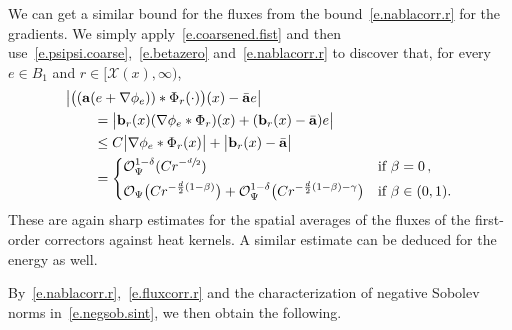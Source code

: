 \documentclass[11pt]{article} %
\numberwithin{equation}{section}
\theoremstyle{definition}
\let\originalleft\left
\let\originalright\right
\renewcommand{\left}{\mathopen{}\mathclose\bgroup\originalleft}
\renewcommand{\right}{\aftergroup\egroup\originalright}
\renewcommand{\b}{\ensuremath{\mathbf{b}}}
\renewcommand{\a}{\mathbf{a}}
\newcommand{\ahom}{\bar{\a}}
\newcommand{\X}{\mathcal{X}}
\renewcommand{\O}{\mathcal{O}}
\begin{document}
\smallskip

We can get a similar bound for the fluxes from the bound~\eqref{e.nablacorr.r} for the gradients. We simply apply~\eqref{e.coarsened.fist} and then use~\eqref{e.psipsi.coarse},~\eqref{e.betazero} and~\eqref{e.nablacorr.r} to discover that, for every $e \in B_1$ and $r \in [\X(x),\infty)$, 
\begin{align}
\label{e.fluxcorr.r}
\lefteqn{
\bigl| \bigl(  ( \a (e + \nabla \phi_e) )   \ast \Phi_r(\cdot)  \bigr) (x) - \ahom e  \bigr| 
} \qquad & 
\notag \\ & 
=
\bigl| \b_r(x) ( \nabla \phi_e \ast \Phi_r) (x) + (\b_r(x) - \ahom) e \bigr|
\notag \\ & 
\leq 
C \bigl| \nabla \phi_e \ast \Phi_r (x)  \bigr| 
+
\bigl| \b_r(x) - \ahom \bigr|
\notag \\ & 
=  
\left\{
\begin{aligned}
& \O_{\Psi}^{1-\delta} (C r^{-\sfrac d2}) & \mbox{if} & \ \beta = 0\,,\\
&\O_{\Psi} \bigl( C r^{-\frac d2(1-\beta)} \bigr) + \O_{\Psi}^{1-\delta} \bigl( C r^{-\frac d2(1-\beta) - \gamma} \bigr)
 & \mbox{if} & \ \beta\in (0,1). \\
\end{aligned}
\right.
\end{align}
These are again sharp estimates for the spatial averages of the fluxes of the first-order correctors against heat kernels. A similar estimate can be deduced for the energy as well. 

\smallskip

By~\eqref{e.nablacorr.r},~\eqref{e.fluxcorr.r} and the characterization of negative Sobolev norms in~\eqref{e.negsob.sint}, we then obtain the following. 
\end{document}
